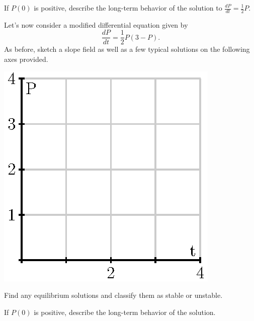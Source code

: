 \begin{pa}
\item If $P(0)$ is positive, describe the long-term behavior of the
  solution to $\frac{dP}{dt} = \frac12 P$.  
\item Let's now consider a modified differential equation given by
  $$
  \frac{dP}{dt} = \frac 12 P(3-P).
  $$
  As before, sketch a slope field as well as a few typical solutions on the following axes provided.
  \begin{center}
    \includegraphics{figures/7_6_preview.eps}
  \end{center}

\item Find any equilibrium solutions and classify them as stable or
  unstable.  

\item If $P(0)$ is positive, describe the long-term behavior of the
  solution.  

\ea
\end{pa} 
\afterpa
